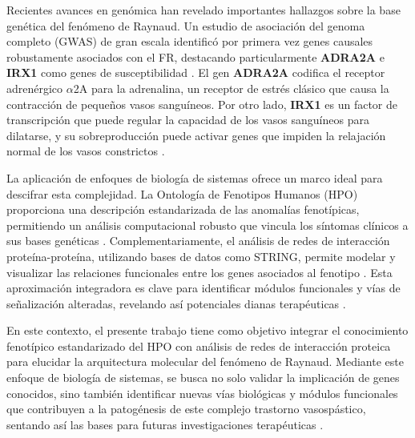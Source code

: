 Recientes avances en genómica han revelado importantes hallazgos sobre la base genética del fenómeno de Raynaud. Un estudio de asociación del genoma completo (GWAS) de gran escala identificó por primera vez genes causales robustamente asociados con el FR, destacando particularmente \textbf{ADRA2A} e \textbf{IRX1} como genes de susceptibilidad \cite{Hartmann2023}. El gen \textbf{ADRA2A} codifica el receptor adrenérgico $\alpha$2A para la adrenalina, un receptor de estrés clásico que causa la contracción de pequeños vasos sanguíneos. Por otro lado, \textbf{IRX1} es un factor de transcripción que puede regular la capacidad de los vasos sanguíneos para dilatarse, y su sobreproducción puede activar genes que impiden la relajación normal de los vasos constrictos \cite{ofLondon2023}.

La aplicación de enfoques de biología de sistemas ofrece un marco ideal para descifrar esta complejidad. La Ontología de Fenotipos Humanos (HPO) proporciona una descripción estandarizada de las anomalías fenotípicas, permitiendo un análisis computacional robusto que vincula los síntomas clínicos a sus bases genéticas \cite{Khler2021, Robinson2008}. Complementariamente, el análisis de redes de interacción proteína-proteína, utilizando bases de datos como STRING, permite modelar y visualizar las relaciones funcionales entre los genes asociados al fenotipo \cite{Szklarczyk2025}. Esta aproximación integradora es clave para identificar módulos funcionales y vías de señalización alteradas, revelando así potenciales dianas terapéuticas \cite{Consortium}.

En este contexto, el presente trabajo tiene como objetivo integrar el conocimiento fenotípico estandarizado del HPO con análisis de redes de interacción proteica para elucidar la arquitectura molecular del fenómeno de Raynaud. Mediante este enfoque de biología de sistemas, se busca no solo validar la implicación de genes conocidos, sino también identificar nuevas vías biológicas y módulos funcionales que contribuyen a la patogénesis de este complejo trastorno vasospástico, sentando así las bases para futuras investigaciones terapéuticas \cite{Naylor2010, Fischer2025}.
